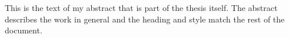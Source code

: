 
This is the text of my abstract that is part of the thesis itself.
The abstract describes the work in general and the heading and style
match the rest of the document.
